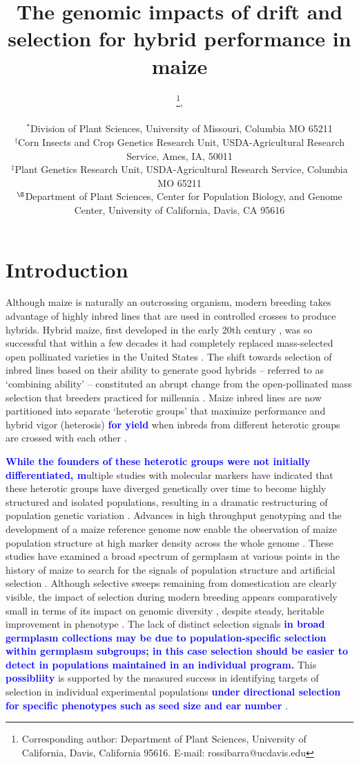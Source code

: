 \documentclass[twocolumn,twoside,letterpaper]{article}
\title{The genomic impacts of drift and selection for hybrid performance in maize}
\author{
 \small\sfbf{Justin P. Gerke$^{\ast,1}$\thanks{
Corresponding author:  DuPont Pioneer, 8305 NW 62ND Ave, P.O. Box 7060
Johnston, IA, 50131   E-mail: \mbox{justin.gerke@gmail.com}}, Jode W. Edwards$^{\dag}$, Katherine E. Guill$^{\ddag}$, Jeffrey Ross-Ibarra$^{\S}$}\thanks{
Corresponding author:  Department of Plant Sciences, University of California, Davis, California 95616. 
    E-mail: \mbox{rossibarra@ucdavis.edu}},\\ 
\small\sfbf{and Michael D. McMullen$^{\ast,\ddag}$}\\[0.3cm]
   \small\sf $^{\ast}$Division of Plant Sciences, University of Missouri, Columbia MO 65211\\
   \small\sf $^\dag$Corn Insects and Crop Genetics Research Unit, USDA-Agricultural Research Service, Ames, IA, 50011\\
   \small\sf $^\ddag$Plant Genetics Research Unit, USDA-Agricultural Research Service, Columbia MO 65211\\
   \small\sf $^\S$Department of Plant Sciences, Center for Population Biology, and Genome Center, University of California, Davis, CA 95616  
}
\newcommand{\rev}[1]{\textcolor{blue}{\bf #1}}
\begin{document}
\maketitle

\section*{Introduction}
Although maize is naturally an outcrossing organism, modern breeding takes advantage of highly inbred lines that are used in controlled crosses to produce hybrids. 
Hybrid maize, first developed in the early 20th century \citep{crow1998}, was so successful that within a few decades it had completely replaced mass-selected open pollinated varieties in the United States \citep{crabb1947hybrid}. 
The shift towards selection of inbred lines based on their ability to generate good hybrids – referred to as ‘combining ability’ – constituted an abrupt change from the open-pollinated mass selection that breeders practiced for millennia \citep{anderson1944sources, troyer1999background}.
Maize inbred lines are now partitioned into separate ‘heterotic groups’ that maximize performance and hybrid vigor (heterosis) \rev{for yield} when inbreds from different heterotic groups are crossed with each other \citep{tracy2006historical}. 

\rev{While the founders of these heterotic groups were not initially differentiated, m}ultiple studies with molecular markers have indicated that these heterotic groups have diverged genetically over time to become highly structured and isolated populations, resulting in a dramatic restructuring of population genetic variation \citep{duvick2004long, ho2005extent, feng2006temporal}. 
Advances in high throughput genotyping and the development of a maize reference genome now enable the observation of maize population structure at high marker density across the whole genome \citep{ganal2011a-large,chia2012maize}. 
These studies have examined a broad spectrum of germplasm at various points in the history of maize to search for the signals of population structure and artificial selection \citep{Hufford2012b, van2012historical,jiao2012genome}. 
Although selective sweeps remaining from domestication are clearly visible, the impact of selection during modern breeding appears comparatively small in terms of its impact on genomic diversity \citep{Hufford2012b,van2012historical}, despite steady, heritable improvement in phenotype \citep{duvick2005contribution}. 
The lack of distinct selection signals \rev{in broad germplasm collections may be due to population-specific selection within germplasm subgroups; in this case selection should be easier to detect in populations maintained in an individual program.} This \rev{possibliity} is supported by the measured success in identifying targets of selection in individual experimental populations \rev{under directional selection for specific phenotypes such as seed size and ear number} \citep{hirsch2014insights, beissinger2014genome}. 
\end{document}
